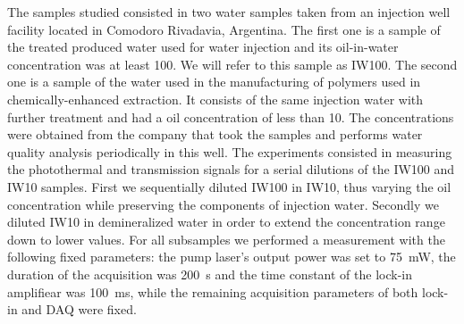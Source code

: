 \documentclass[9pt,twocolumn,twoside]{osajnl}
\newcommand{\FE}{\textit{FE}}
\begin{document}


The samples studied consisted in two water samples taken from an injection well facility located in Comodoro Rivadavia, Argentina. The first one is a sample of the treated produced water used for water injection and its oil-in-water concentration was at least \SI{100}{\ppm}. We will refer to this sample as IW100. The second one is a sample of the water used in the manufacturing of polymers used in chemically-enhanced extraction. It consists of the same injection water with further treatment and had a oil concentration of less than \SI{10}{\ppm}. The concentrations were obtained from the company that took the samples and performs water quality analysis periodically in this well. The experiments consisted in measuring the photothermal and transmission signals for a serial dilutions of the IW100 and IW10 samples. First we sequentially diluted IW100 in IW10, thus varying the oil concentration while preserving the components of injection water. Secondly we diluted IW10 in demineralized water in order to extend the concentration range down to lower values. For all subsamples we performed a measurement with the following fixed parameters: the pump laser's output power was set to \SI{75}{\milli\watt}, the duration of the acquisition was \SI{200}{\second} and the time constant of the lock-in amplifiear was \SI{100}{\milli\second}, while the remaining acquisition parameters of both lock-in and DAQ were fixed.
\end{document}
